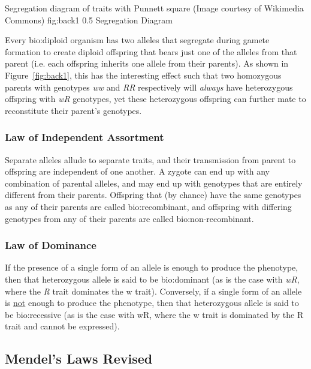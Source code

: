 	{Segregation diagram of traits with Punnett square (Image courtesy of Wikimedia Commons)}
	{fig:back1}
	{0.5}
	{Segregation Diagram}

Every \gls{bio:diploid} organism has two alleles that segregate during gamete formation to create diploid offspring that bears just one of the alleles from that parent (i.e. each offspring inherits one allele from their parents). As shown in Figure~\ref{fig:back1}, this has the interesting effect such that two homozygous parents with genotypes \textit{ww} and \textit{RR} respectively will \textit{always} have heterozygous offspring with \textit{wR} genotypes, yet these heterozygous offspring can further mate to reconstitute their parent's genotypes.


\subsubsection{Law of Independent Assortment}

Separate alleles allude to separate traits, and their transmission from parent to offspring are independent of one another. A zygote can end up with any combination of parental alleles, and may end up with genotypes that are entirely different from their parents. Offspring that (by chance) have the same genotypes as any of their parents are called \gls{bio:recombinant}, and offspring with differing genotypes from any of their parents are called \gls{bio:non-recombinant}.

\subsubsection{Law of Dominance}

If the presence of a single form of an allele is enough to produce the phenotype, then that heterozygous allele is said to be \gls{bio:dominant} (as is the case with \textit{wR}, where the \textit{R} trait dominates the w trait). Conversely, if a single form of an allele is \underline{not} enough to produce the phenotype, then that heterozygous allele is said to be \gls{bio:recessive} (as is the case with wR, where the w trait is dominated by the R trait and cannot be expressed).


\subsection{Mendel's Laws Revised}

